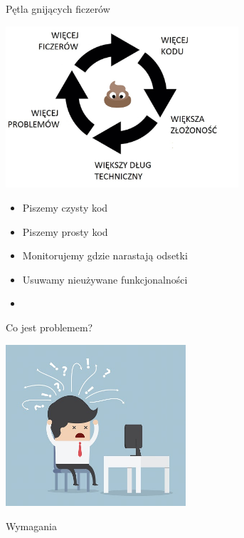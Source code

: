 \documentclass{beamer}
\begin{document}
\begin{frame}{Pętla gnijących ficzerów}
\begin{center}
  	\includegraphics[height=6cm]{pgf7.jpg}
\end{center}
\end{frame}

\begin{frame}{}
     \begin{Large}
	\begin{itemize}
		\item Piszemy czysty kod
		\item Piszemy prosty kod
		\item Monitorujemy gdzie narastają odsetki
		\item Usuwamy nieużywane funkcjonalności
		\item 
	\end{itemize}
     \end{Large}
\end{frame}


\begin{frame}{Co jest problemem?}
\begin{center}
  	\includegraphics[height=6cm]{problem.jpg}
\end{center}
\end{frame}

\begin{frame}{}
\begin{center}
\Huge{Wymagania}
\end{center}
\end{frame}
\end{document}
